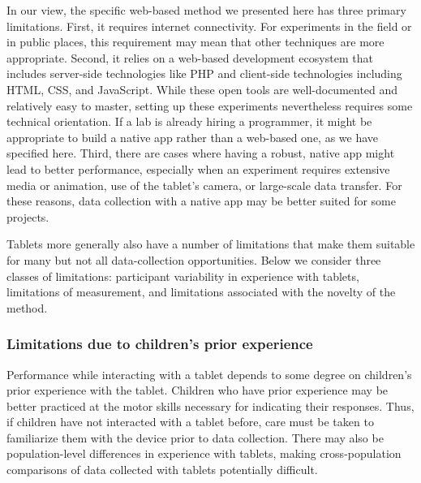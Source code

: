 \documentclass[man,noapacite]{apa2}
\begin{document}
In our view, the specific web-based method we presented here has three primary limitations. First, it requires internet connectivity. For experiments in the field or in public places, this requirement may mean that other techniques are more appropriate. Second, it relies on a web-based development ecosystem that includes server-side technologies like PHP and client-side technologies including HTML, CSS, and JavaScript. While these open tools are well-documented and relatively easy to master, setting up these experiments nevertheless requires some technical orientation. If a lab is already hiring a programmer, it might be appropriate to build a native app rather than a web-based one, as we have specified here. Third, there are cases where having a robust, native app might lead to better performance, especially when an experiment requires extensive media or animation, use of the tablet's camera, or large-scale data transfer.  For these reasons, data collection with a native app may be better suited for some projects.


Tablets more generally also have a number of limitations that make them suitable for many but not all data-collection opportunities. Below we consider three classes of limitations: participant variability in experience with tablets, limitations of measurement, and limitations associated with the novelty of the method.

\subsubsection{Limitations due to children's prior experience} 
Performance while interacting with a tablet depends to some degree  on children's prior experience with the tablet. Children who have prior experience may be better practiced at the motor skills necessary for indicating their responses. Thus, if children have not interacted with a tablet before, care must be taken to familiarize them with the device prior to data collection. There may also be population-level differences in experience with tablets, making cross-population comparisons of data collected with tablets potentially difficult.
\end{document}
